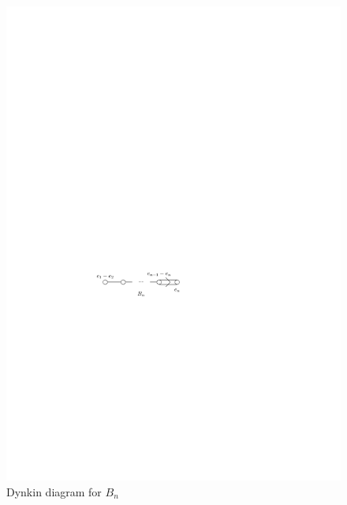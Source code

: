 \begin{itemize}
\begin{itemize}
		\begin{figure}[H]
			\centering
			\includegraphics[scale=1]{figures/Dynkin diagram for Bn.pdf}
			\caption{Dynkin diagram for $B_n$}
		\end{figure}
	\end{itemize}
\end{itemize}

